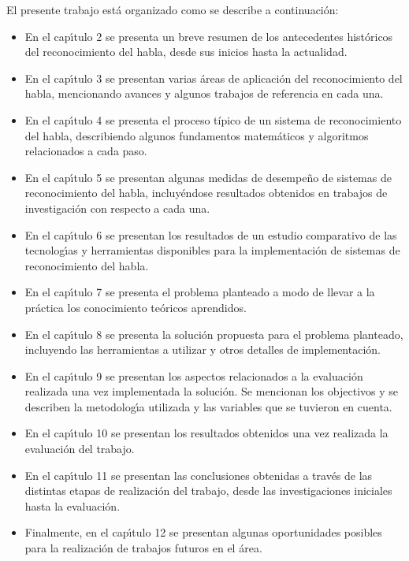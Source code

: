 El presente trabajo est\'a organizado como se describe a continuaci\'on:

\begin{itemize}
	\item En el cap{\'\i}tulo 2 se presenta un breve resumen de los antecedentes hist\'oricos del reconocimiento
	del habla, desde sus inicios hasta la actualidad.
	\item En el cap{\'\i}tulo 3 se presentan varias \'areas de aplicaci\'on del reconocimiento del habla, 
	mencionando avances y algunos trabajos de referencia en cada una.
	\item En el cap{\'\i}tulo 4 se presenta el proceso t\'{i}pico de un sistema de reconocimiento del habla,
	describiendo algunos fundamentos matem\'aticos y algoritmos relacionados a cada paso.
	\item En el cap{\'\i}tulo 5 se presentan algunas medidas de desempe\~no de sistemas de reconocimiento del
	habla, incluy\'endose resultados obtenidos en trabajos de investigaci\'on con respecto a cada una.
	\item En el cap{\'\i}tulo 6 se presentan los resultados de un estudio comparativo de las tecnolog{\'\i}as
	y herramientas disponibles para la implementaci\'on de sistemas de reconocimiento del habla.
	\item En el cap{\'\i}tulo 7 se presenta el problema planteado a modo de llevar a la pr\'actica los
	conocimiento te\'oricos aprendidos.
	\item En el cap{\'\i}tulo 8 se presenta la soluci\'on propuesta para el problema planteado, incluyendo
	las herramientas a utilizar y otros detalles de implementaci\'on.
	\item En el cap{\'\i}tulo 9 se presentan los aspectos relacionados a la evaluaci\'on realizada una vez
	implementada la soluci\'on. Se mencionan los objectivos y se describen la metodolog{\'\i}a utilizada
	y las variables que se tuvieron en cuenta.
	\item En el cap{\'\i}tulo 10 se presentan los resultados obtenidos una vez realizada la evaluaci\'on
	del trabajo.
	\item En el cap{\'\i}tulo 11 se presentan las conclusiones obtenidas a trav\'es de las distintas
	etapas de realizaci\'on del trabajo, desde las investigaciones iniciales hasta la evaluaci\'on.
	\item Finalmente, en el cap{\'\i}tulo 12 se presentan algunas oportunidades posibles para
	la realizaci\'on de trabajos futuros en el \'area.
\end{itemize}